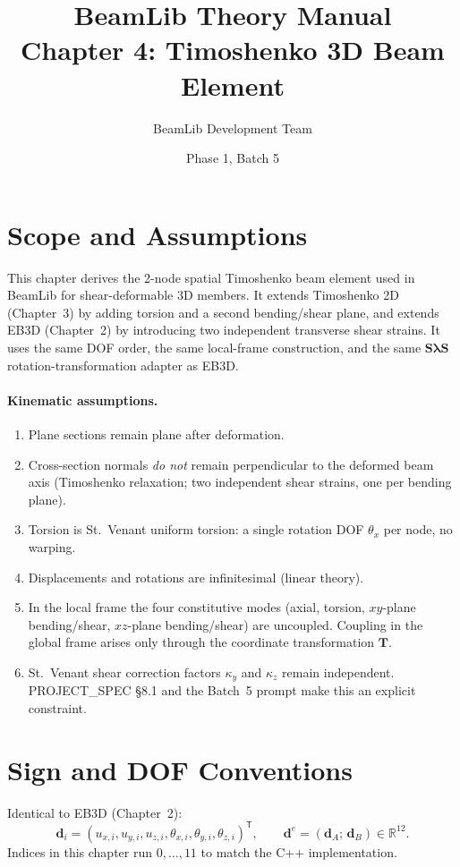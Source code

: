 \documentclass[11pt,a4paper]{article}
\title{BeamLib Theory Manual \\ Chapter 4: Timoshenko 3D Beam Element}
\author{BeamLib Development Team}
\date{Phase 1, Batch 5}
\newcommand{\bmath}[1]{\boldsymbol{#1}}
\newcommand{\Sdiag}{\bmath{S}}
\newcommand{\lam}{\bmath{\lambda}}
\begin{document}
\maketitle

\section{Scope and Assumptions}

This chapter derives the 2-node spatial Timoshenko beam element used in BeamLib for shear-deformable 3D members. It extends Timoshenko 2D (Chapter~3) by adding torsion and a second bending/shear plane, and extends EB3D (Chapter~2) by introducing two independent transverse shear strains. It uses the same DOF order, the same local-frame construction, and the same $\Sdiag\lam\Sdiag$ rotation-transformation adapter as EB3D.

\paragraph{Kinematic assumptions.}
\begin{enumerate}
    \item Plane sections remain plane after deformation.
    \item Cross-section normals \emph{do not} remain perpendicular to the deformed beam axis (Timoshenko relaxation; two independent shear strains, one per bending plane).
    \item Torsion is St.\ Venant uniform torsion: a single rotation DOF $\theta_x$ per node, no warping.
    \item Displacements and rotations are infinitesimal (linear theory).
    \item In the local frame the four constitutive modes (axial, torsion, $xy$-plane bending/shear, $xz$-plane bending/shear) are uncoupled. Coupling in the global frame arises only through the coordinate transformation $\bmath{T}$.
    \item St.\ Venant shear correction factors $\kappa_y$ and $\kappa_z$ remain independent. PROJECT\_SPEC \S8.1 and the Batch~5 prompt make this an explicit constraint.
\end{enumerate}

\section{Sign and DOF Conventions}\label{sec:signs}

Identical to EB3D (Chapter~2):
\[
\bmath{d}_i = (u_{x,i}, u_{y,i}, u_{z,i}, \theta_{x,i}, \theta_{y,i}, \theta_{z,i})^\mathsf{T},
\qquad
\bmath{d}^e = (\bmath{d}_A;\,\bmath{d}_B) \in \mathbb{R}^{12}.
\]
Indices in this chapter run $0,\dots,11$ to match the C++ implementation.
\end{document}
